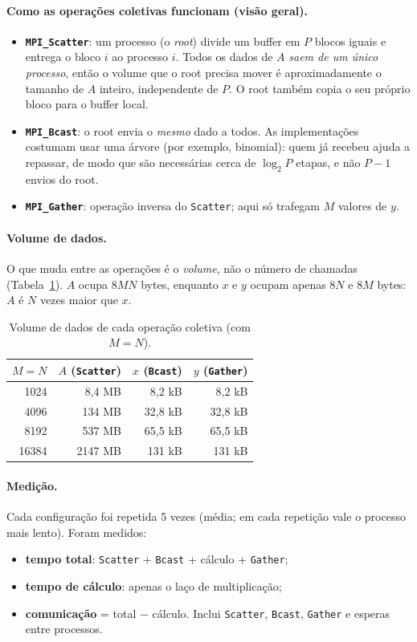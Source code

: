 \documentclass[a4paper,12pt]{article}
\begin{document}
\paragraph{Como as operações coletivas funcionam (visão geral).}
\begin{itemize}
    \item \textbf{\texttt{MPI\_Scatter}}: um processo (o \textit{root}) divide um buffer em $P$ blocos iguais e entrega o bloco $i$ ao processo $i$. Todos os dados de $A$ \emph{saem de um único processo}, então o volume que o root precisa mover é aproximadamente o tamanho de $A$ inteiro, independente de $P$. O root também copia o seu próprio bloco para o buffer local.
    \item \textbf{\texttt{MPI\_Bcast}}: o root envia o \emph{mesmo} dado a todos. As implementações costumam usar uma árvore (por exemplo, binomial): quem já recebeu ajuda a repassar, de modo que são necessárias cerca de $\log_2 P$ etapas, e não $P-1$ envios do root.
    \item \textbf{\texttt{MPI\_Gather}}: operação inversa do \texttt{Scatter}; aqui só trafegam $M$ valores de $y$.
\end{itemize}

\paragraph{Volume de dados.} O que muda entre as operações é o \emph{volume}, não o número de chamadas (Tabela~\ref{tab:vol}). $A$ ocupa $8MN$ bytes, enquanto $x$ e $y$ ocupam apenas $8N$ e $8M$ bytes: $A$ é $N$ vezes maior que $x$.

\begin{table}[h!]
\centering
\begin{tabular}{rrrr}
\toprule
$M=N$ & $A$ (\texttt{Scatter}) & $x$ (\texttt{Bcast}) & $y$ (\texttt{Gather}) \\
\midrule
1024  & 8{,}4 MB  & 8{,}2 kB   & 8{,}2 kB \\
4096  & 134 MB    & 32{,}8 kB  & 32{,}8 kB \\
8192  & 537 MB    & 65{,}5 kB  & 65{,}5 kB \\
16384 & 2147 MB   & 131 kB     & 131 kB \\
\bottomrule
\end{tabular}
\caption{Volume de dados de cada operação coletiva (com $M=N$).}
\label{tab:vol}
\end{table}

\paragraph{Medição.} Cada configuração foi repetida 5 vezes (média; em cada repetição vale o processo mais lento). Foram medidos:
\begin{itemize}
    \item \textbf{tempo total}: \texttt{Scatter} + \texttt{Bcast} + cálculo + \texttt{Gather};
    \item \textbf{tempo de cálculo}: apenas o laço de multiplicação;
    \item \textbf{comunicação} = total $-$ cálculo. Inclui \texttt{Scatter}, \texttt{Bcast}, \texttt{Gather} e esperas entre processos.
\end{itemize}
\end{document}
